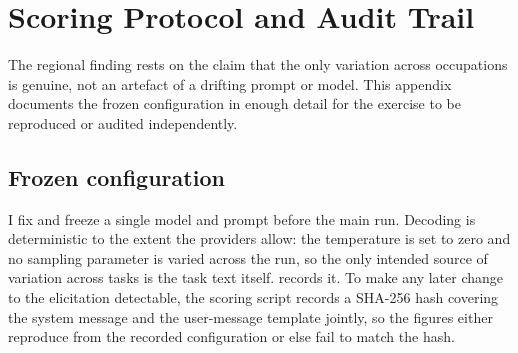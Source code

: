 \section{Scoring Protocol and Audit Trail}\label{app:protocol}

The regional finding rests on the claim that the only variation across occupations is genuine, not an artefact of a drifting prompt or model. This appendix documents the frozen configuration in enough detail for the exercise to be reproduced or audited independently.

\subsection{Frozen configuration}

I fix and freeze a single model and prompt before the main run. Decoding is deterministic to the extent the providers allow: the temperature is set to zero and no sampling parameter is varied across the run, so the only intended source of variation across tasks is the task text itself.  records it. To make any later change to the elicitation detectable, the scoring script records a SHA-256 hash covering the system message and the user-message template jointly, so the figures either reproduce from the recorded configuration or else fail to match the hash.

